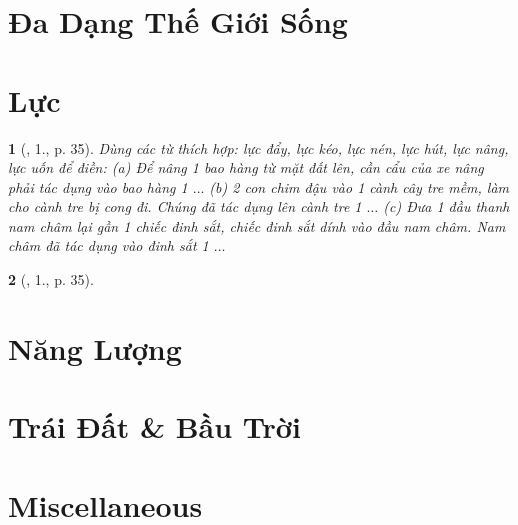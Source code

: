 \documentclass{article}
\newtheorem{baitoan}{}
\begin{document}

\section{Đa Dạng Thế Giới Sống}


\section{Lực}

\begin{baitoan}[\cite{ncpt_KHTN_6_tap_2}, 1., p. 35]
	Dùng các từ thích hợp: lực đẩy, lực kéo, lực nén, lực hút, lực nâng, lực uốn để điền: (a) Để nâng 1 bao hàng từ mặt đất lên, cần cẩu của xe nâng phải tác dụng vào bao hàng 1 $\ldots$ (b) 2 con chim đậu vào 1 cành cây tre mềm, làm cho cành tre bị cong đi. Chúng đã tác dụng lên cành tre 1 $\ldots$ (c) Đưa 1 đầu thanh nam châm lại gần 1 chiếc đinh sắt, chiếc đinh sắt dính vào đầu nam châm. Nam châm đã tác dụng vào đinh sắt 1 $\ldots$
\end{baitoan}

\begin{baitoan}[\cite{ncpt_KHTN_6_tap_2}, 1., p. 35]
	
\end{baitoan}


\section{Năng Lượng}


\section{Trái Đất \& Bầu Trời}


\section{Miscellaneous}


\printbibliography[heading=bibintoc]
	
\end{document}
